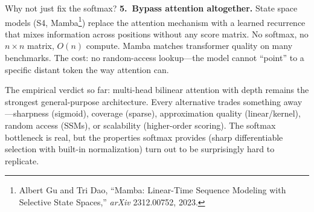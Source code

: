 \begin{whynotbox}{Why not just fix the softmax?}
\textbf{5.\ Bypass attention altogether.} State space models (S4, Mamba\footnote{Albert Gu and Tri Dao, ``Mamba: Linear-Time Sequence Modeling with Selective State Spaces,'' \emph{arXiv} 2312.00752, 2023.}) replace the attention mechanism with a learned recurrence that mixes information across positions without any score matrix. No softmax, no $n \times n$ matrix, $O(n)$ compute. Mamba matches transformer quality on many benchmarks. The cost: no random-access lookup---the model cannot ``point'' to a specific distant token the way attention can.

The empirical verdict so far: multi-head bilinear attention with depth remains the strongest general-purpose architecture. Every alternative trades something away---sharpness (sigmoid), coverage (sparse), approximation quality (linear/kernel), random access (SSMs), or scalability (higher-order scoring). The softmax bottleneck is real, but the properties softmax provides (sharp differentiable selection with built-in normalization) turn out to be surprisingly hard to replicate.
\end{whynotbox}

